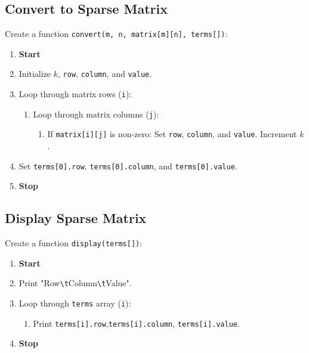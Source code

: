  {\selectfont
  \subsection{Convert to Sparse Matrix}
  Create a function \texttt{convert(m, n, matrix[m][n], terms[])}:
  \begin{enumerate}
    \item \textbf{Start}
    \item Initialize $k$, \texttt{row}, \texttt{column}, and \texttt{value}.
    \item Loop through matrix rows (\texttt{i}):
          \begin{enumerate}[label=2.\arabic*.]
            \item Loop through matrix columns (\texttt{j}):
                  \begin{enumerate}[label=2.1.\arabic*.]
                    \item If \texttt{matrix[i][j]} is non-zero:
                          Set \texttt{row}, \texttt{column}, and \texttt{value}.
                          Increment $k$.
                  \end{enumerate}
          \end{enumerate}
    \item Set \texttt{terms[0].row}, \texttt{terms[0].column}, and \texttt{terms[0].value}.
    \item \textbf{Stop}
  \end{enumerate}

  \subsection{Display Sparse Matrix}
  Create a function \texttt{display(terms[])}:
  \begin{enumerate}
    \item \textbf{Start}
    \item Print "Row\texttt{\textbackslash t}Column\texttt{\textbackslash t}Value".
    \item Loop through \texttt{terms} array (\texttt{i}):
          \begin{enumerate}[label=3.\arabic*.]
            \item Print \texttt{terms[i].row},\texttt{terms[i].column}, \texttt{terms[i].value}.
          \end{enumerate}
    \item \textbf{Stop}
  \end{enumerate}

}
